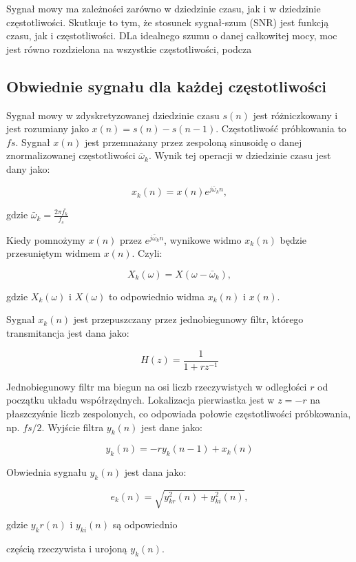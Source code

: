 \documentclass[eng,printmode]{mgr}
\begin{document}
 Sygnał mowy ma zależności zarówno w dziedzinie czasu, jak i w dziedzinie częstotliwości. Skutkuje to tym, że stosunek sygnał-szum (SNR) jest funkcją czasu, jak i częstotliwości. DLa idealnego szumu o danej całkowitej mocy, moc jest równo rozdzielona na wszystkie częstotliwości, podcza
 
 \subsection{Obwiednie sygnału dla każdej częstotliwości}
 Sygnał mowy w zdyskretyzowanej dziedzinie czasu $s(n)$ jest różniczkowany i jest rozumiany jako $x(n) = s(n) - s(n-1)$. Częstotliwość próbkowania to $fs$. Sygnał $x(n)$ jest przemnażany przez zespoloną sinusoidę o danej znormalizowanej częstotliwości $\bar{\omega}_{k}$.  Wynik tej operacji w dziedzinie czasu jest dany jako: 
 
 $$x_{k}(n) = x(n)e^{j\bar{\omega}_{k}n},$$
 
 \hspace{8cm}gdzie $\bar{\omega}_{k} = \frac{2\pi\bar{f_{k}}}{f_{s}}$\vspace{5mm}
 
 Kiedy pomnożymy $x(n)$ przez $e^{j\bar{\omega}_{k}n}$, wynikowe widmo $x_{k}(n)$ będzie przesuniętym widmem $x(n)$. Czyli:
 
 $$X_{k}(\omega) = X(\omega - \bar{\omega}_{k}),$$
 
 gdzie $X_{k}(\omega)$ i $X(\omega)$ to odpowiednio widma  $x_{k}(n)$ i $x(n)$.\vspace{5mm}
 
 Sygnał $x_{k}(n)$ jest przepuszczany przez jednobiegunowy filtr, którego transmitancja jest dana jako:
 
 $$H(z) = \frac{1}{1+rz^{-1}}$$
 
 Jednobiegunowy filtr ma biegun na osi liczb rzeczywistych w odległości $r$ od początku układu współrzędnych. Lokalizacja pierwiastka jest w $z = -r$ na płaszczyśnie liczb zespolonych, co odpowiada połowie częstotliwości próbkowania, np. $fs/2$. Wyjście filtra $y_{k}(n)$ jest dane jako:
 
 $$y_{k}(n) = -r y_{k}(n-1)+x_{k}(n)$$
 
  Obwiednia sygnału $y_{k}(n)$ jest dana jako:
  
  $$e_{k}(n) = \sqrt{y_{kr}^2(n) + y_{ki}^2(n)},$$ 
  
  \hspace{8cm}gdzie $y_kr(n)$ i $y_{ki}(n)$ są odpowiednio 
  
  \hspace{8cm}częścią rzeczywista i urojoną $y_{k}(n)$.\vspace{5mm}
  
\end{document}
